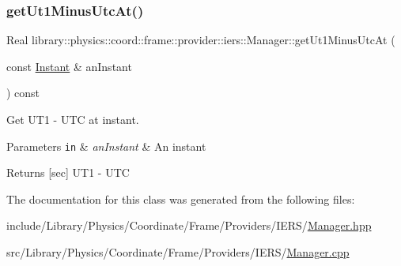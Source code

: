 \subsubsection{\texorpdfstring{get\+Ut1\+Minus\+Utc\+At()}{getUt1MinusUtcAt()}}
{\footnotesize\ttfamily Real library\+::physics\+::coord\+::frame\+::provider\+::iers\+::\+Manager\+::get\+Ut1\+Minus\+Utc\+At (\begin{DoxyParamCaption}\item[{const \hyperlink{classlibrary_1_1physics_1_1time_1_1_instant}{Instant} \&}]{an\+Instant }\end{DoxyParamCaption}) const}



Get U\+T1 -\/ U\+TC at instant. 


\begin{DoxyParams}[1]{Parameters}
\mbox{\tt in}  & {\em an\+Instant} & An instant \\
\hline
\end{DoxyParams}
\begin{DoxyReturn}{Returns}
\mbox{[}sec\mbox{]} U\+T1 -\/ U\+TC 
\end{DoxyReturn}


The documentation for this class was generated from the following files\+:\begin{DoxyCompactItemize}
\item 
include/\+Library/\+Physics/\+Coordinate/\+Frame/\+Providers/\+I\+E\+R\+S/\hyperlink{_providers_2_i_e_r_s_2_manager_8hpp}{Manager.\+hpp}\item 
src/\+Library/\+Physics/\+Coordinate/\+Frame/\+Providers/\+I\+E\+R\+S/\hyperlink{_providers_2_i_e_r_s_2_manager_8cpp}{Manager.\+cpp}\end{DoxyCompactItemize}
